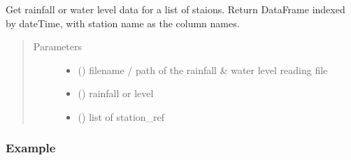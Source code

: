 \documentclass[letterpaper,10pt,english]{sphinxmanual}
\begin{document}
\begin{fulllineitems}
\label{\detokenize{index:flood_tool.get_station_reading}}
\sphinxAtStartPar
Get rainfall or water level data for a list of staions.
Return DataFrame indexed by dateTime, with station name as the column names.
\begin{quote}\begin{description}
\item[{Parameters}] \leavevmode\begin{itemize}
\item {} 
\sphinxAtStartPar
{} () \textendash{} filename / path of the rainfall \& water level reading file

\item {} 
\sphinxAtStartPar
{} () \textendash{} rainfall or level

\item {} 
\sphinxAtStartPar
{} () \textendash{} list of station\_ref

\end{itemize}

\end{description}\end{quote}
\subsubsection*{Example}

\begin{sphinxVerbatim}[commandchars=\\\{\}]
\PYG{p}{[}  \PYG{p}{]}
\end{sphinxVerbatim}

\end{fulllineitems}
\end{document}
